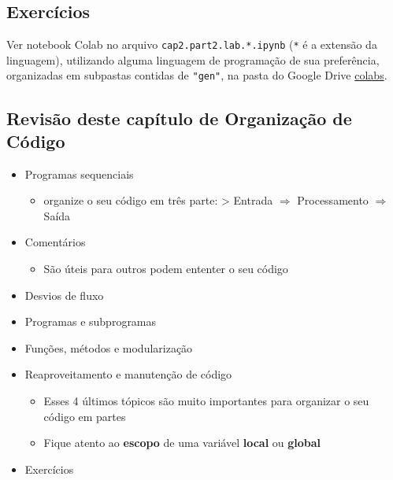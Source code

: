 \documentclass[12pt,a4paper]{article}
\providecommand{\tightlist}{%
      \setlength{\itemsep}{0pt}\setlength{\parskip}{0pt}}
\begin{document}
    \hypertarget{exercuxedcios}{%
\subsection{Exercícios}\label{exercuxedcios}}

    Ver notebook Colab no arquivo \texttt{cap2.part2.lab.*.ipynb}
(\texttt{*} é a extensão da linguagem), utilizando alguma linguagem de
programação de sua preferência, organizadas em subpastas contidas de
\texttt{"gen"}, na pasta do Google Drive
\href{https://drive.google.com/drive/folders/1YlFwv8XYN7PYYf-HwDMlkxzbmXzJw9cM?usp=sharing}{colabs}.

    \hypertarget{revisuxe3o-deste-capuxedtulo-de-organizauxe7uxe3o-de-cuxf3digo}{%
\subsection{Revisão deste capítulo de Organização de
Código}\label{revisuxe3o-deste-capuxedtulo-de-organizauxe7uxe3o-de-cuxf3digo}}

\begin{itemize}
\tightlist
\item
  Programas sequenciais

  \begin{itemize}
  \tightlist
  \item
    organize o seu código em três parte: \textgreater{} Entrada
    \(\Rightarrow\) Processamento \(\Rightarrow\) Saída
  \end{itemize}
\item
  Comentários

  \begin{itemize}
  \tightlist
  \item
    São úteis para outros podem ententer o seu código
  \end{itemize}
\item
  Desvios de fluxo
\item
  Programas e subprogramas
\item
  Funções, métodos e modularização
\item
  Reaproveitamento e manutenção de código

  \begin{itemize}
  \tightlist
  \item
    Esses 4 últimos tópicos são muito importantes para organizar o seu
    código em partes
  \item
    Fique atento ao \textbf{escopo} de uma variável \textbf{local} ou
    \textbf{global}
  \end{itemize}
\item
  Exercícios
\end{itemize}


    
    
    
\end{document}
